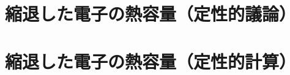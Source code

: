 %
\section{縮退した電子の熱容量（定性的議論）}


















































%
\section{縮退した電子の熱容量（定性的計算）}

